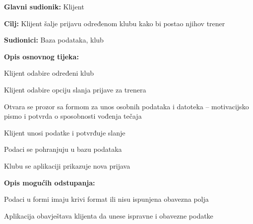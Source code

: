 					
					\noindent {}
					\begin{packed_item}
	
						\item \textbf{Glavni sudionik: }Klijent
						\item  \textbf{Cilj:} Klijent šalje prijavu određenom klubu kako bi postao njihov trener
						\item  \textbf{Sudionici:} Baza podataka, klub
						\item  \textbf{Opis osnovnog tijeka:						
						}
						
						\item[] \begin{packed_enum}
	
							\item Klijent odabire određeni klub
							\item Klijent odabire opciju slanja prijave za trenera
							\item Otvara se prozor sa formom za unos osobnih podataka i datoteka – motivacijsko pismo i potvrda o sposobnosti vođenja tečaja
							\item Klijent unosi podatke i potvrđuje slanje
							\item Podaci se pohranjuju u bazu podataka
							\item Klubu se aplikaciji prikazuje nova prijava
						\end{packed_enum}
						
						\item  \textbf{Opis mogućih odstupanja:}
						
						\item[] \begin{packed_item}
	
							\item[4.a] Podaci u formi imaju krivi format ili nisu ispunjena obavezna polja
							\item[] \begin{packed_enum}
								
								\item Aplikacija obavještava klijenta da unese ispravne i obavezne podatke
																
							\end{packed_enum}
														
						\end{packed_item}
					\end{packed_item}
					
